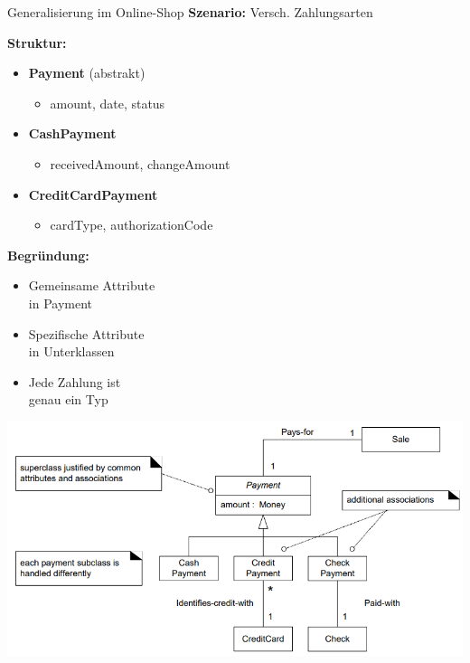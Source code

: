\begin{example2}{Generalisierung im Online-Shop}
\textbf{Szenario:} Versch. Zahlungsarten

\begin{minipage}[t]{0.58\linewidth}
\textbf{Struktur:}
\begin{itemize}
    \item \textbf{Payment} (abstrakt)
    \begin{itemize}
        \item amount, date, status
    \end{itemize}
    \item \textbf{CashPayment}
    \begin{itemize}
        \item receivedAmount, changeAmount
    \end{itemize}
    \item \textbf{CreditCardPayment}
    \begin{itemize}
        \item cardType, authorizationCode
    \end{itemize}
\end{itemize}
\end{minipage}
\begin{minipage}[t]{0.4\linewidth}
\textbf{Begründung:}
\begin{itemize}
    \item Gemeinsame Attribute \\in Payment
    \item Spezifische Attribute \\in Unterklassen
    \item Jede Zahlung ist\\ genau ein Typ
\end{itemize}
\end{minipage}

\includegraphics[width=\linewidth]{images/generalisierung_extended.png}
\end{example2}

